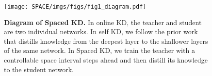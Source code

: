 \begin{figure}
    \centering
     \vspace{+.2cm}
    \texttt{[image: SPACE/imgs/figs/fig1\_diagram.pdf]}
    \vspace{-.1cm}
    \caption{\textbf{Diagram of Spaced KD.} In online KD, the teacher and student are two individual networks. In self KD, we follow the prior work~\citep{self-kd} that distills knowledge from the deepest layer to the shallower layers of the same network. In Spaced KD, we train the teacher with a controllable space interval steps ahead and then distill its knowledge to the student network.
    }
    \label{fig:diagram}
    \vspace{-.4cm}
\end{figure}